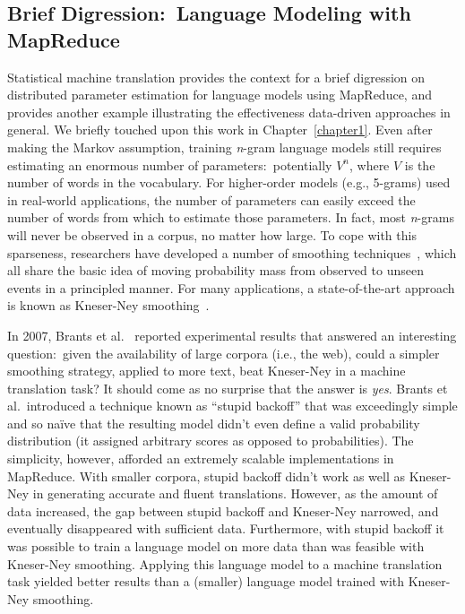 \subsection{Brief Digression:\ Language Modeling with MapReduce}

Statistical machine translation provides the context for a brief
digression on distributed parameter estimation for language models
using MapReduce, and provides another example illustrating the
effectiveness data-driven approaches in general.  We briefly touched
upon this work in Chapter~\ref{chapter1}.  Even after making the
Markov assumption, training {\it n}-gram language models still
requires estimating an enormous number of parameters:\ potentially
$V^n$, where $V$ is the number of words in the vocabulary.  For
higher-order models (e.g., 5-grams) used in real-world applications,
the number of parameters can easily exceed the number of words from
which to estimate those parameters.  In fact, most {\it n}-grams will
never be observed in a corpus, no matter how large.  To cope with this
sparseness, researchers have developed a number of smoothing
techniques~\cite{Manning_Schutze_1999}, which all share the basic idea
of moving probability mass from observed to unseen events in a
principled manner.  For many applications, a state-of-the-art approach
is known as Kneser-Ney smoothing~\cite{Chen_Goodman_ACL1996}.

In 2007, Brants et al.~\cite{Brants_etal_EMNLP2007} reported
experimental results that answered an interesting question:\ given the
availability of large corpora (i.e., the web), could a simpler
smoothing strategy, applied to more text, beat Kneser-Ney in a machine
translation task?  It should come as no surprise that the answer is
{\it yes}. Brants et al.\ introduced a technique known as ``stupid
backoff'' that was exceedingly simple and so na\"{i}ve that the
resulting model didn't even define a valid probability distribution
(it assigned arbitrary scores as opposed to probabilities).  The
simplicity, however, afforded an extremely scalable implementations in
MapReduce.  With smaller corpora, stupid backoff didn't work as well
as Kneser-Ney in generating accurate and fluent translations.
However, as the amount of data increased, the gap between stupid
backoff and Kneser-Ney narrowed, and eventually disappeared with
sufficient data.  Furthermore, with stupid backoff it was possible to
train a language model on more data than was feasible with Kneser-Ney
smoothing.  Applying this language model to a machine translation task
yielded better results than a (smaller) language model trained with
Kneser-Ney smoothing.

